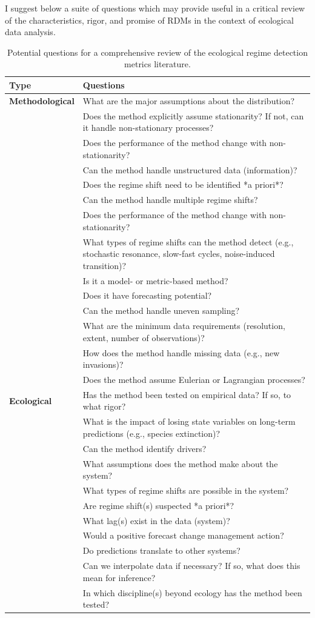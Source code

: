 \documentclass[12pt,twoside,openany]{reedthesis}
\begin{document}
I suggest below a suite of questions which may provide useful in a
critical review of the characteristics, rigor, and promise of RDMs in
the context of ecological data analysis.
\begin{longtable}{>{\bfseries}l|>{\raggedright\arraybackslash}p{30em}}
\caption{\label{tab:nextStepsTab}Potential questions for a comprehensive review of the ecological regime detection metrics literature.}\\
\toprule
Type & Questions\\
\midrule
Methodological & What are the major assumptions about the distribution?\\
 & Does the method explicitly assume stationarity? If not, can it handle non-stationary processes?\\
 & Does the performance of the method change with non-stationarity?\\
 & Can the method handle unstructured data (information)?\\
 & Does the regime shift need to be identified *a priori*?\\
\addlinespace
 & Can the method handle multiple regime shifts?\\
 & Does the performance of the method change with non-stationarity?\\
 & What types of regime shifts can the method detect (e.g., stochastic resonance, slow-fast cycles, noise-induced transition)?\\
 & Is it a model- or metric-based method?\\
 & Does it have forecasting potential?\\
\addlinespace
 & Can the method handle uneven sampling?\\
 & What are the minimum data requirements (resolution, extent, number of observations)?\\
 & How does the method handle missing data (e.g., new invasions)?\\
 & Does the method assume Eulerian or Lagrangian processes?\\
Ecological & Has the method been tested on empirical data? If so, to what rigor?\\
\addlinespace
 & What is the impact of losing state variables on long-term predictions (e.g., species extinction)?\\
 & Can the method identify drivers?\\
 & What assumptions does the method make about the system?\\
 & What types of regime shifts are possible in the system?\\
 & Are regime shift(s) suspected *a priori*?\\
\addlinespace
 & What lag(s) exist in the data (system)?\\
 & Would a positive forecast change management action?\\
 & Do predictions translate to other systems?\\
 & Can we interpolate data if necessary? If so, what does this mean for inference?\\
 & In which discipline(s) beyond ecology has the method been tested?\\
\bottomrule
\end{longtable}
\end{document}

